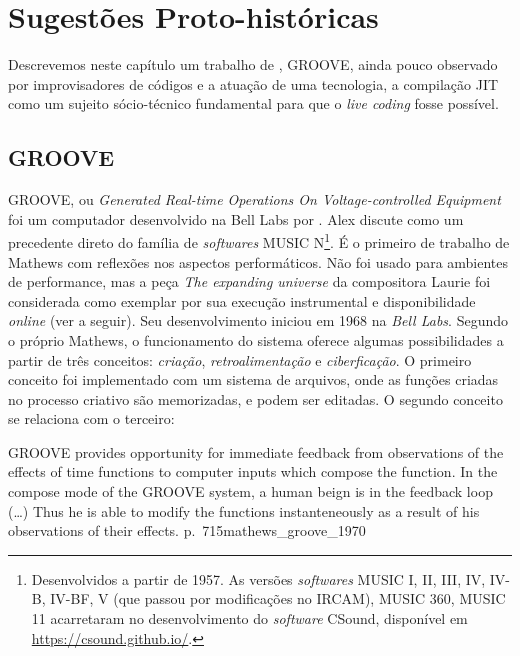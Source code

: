 \chapter{Sugestões Proto-históricas}\label{app:B}

Descrevemos neste capítulo um trabalho de , GROOVE, ainda pouco observado por improvisadores de códigos e a atuação de uma tecnologia, a compilação JIT \cite{aycock_brief_2003} como um sujeito sócio-técnico fundamental para que o \emph{live coding} fosse possível.

\section{GROOVE}

GROOVE, ou \emph{Generated Real-time Operations On Voltage-controlled Equipment} foi um computador desenvolvido na Bell Labs por \cite{mathews_groove_1970}. Alex  discute como um precedente direto do família de \emph{softwares} MUSIC N\footnote{Desenvolvidos a partir de 1957. As versões \emph{softwares} MUSIC I, II, III, IV, IV-B, IV-BF, V (que passou por modificações no IRCAM), MUSIC 360, MUSIC 11 acarretaram no desenvolvimento do \emph{software} CSound, disponível em \url{https://csound.github.io/}.}. É o primeiro de trabalho de Mathews com reflexões nos aspectos performáticos. Não foi usado para ambientes de performance, mas a peça \emph{The expanding universe} da compositora Laurie  foi considerada como exemplar por sua execução instrumental e disponibilidade \emph{online} (ver a seguir). Seu desenvolvimento iniciou em 1968 na \emph{Bell Labs}. Segundo o próprio Mathews, o funcionamento do sistema oferece algumas possibilidades a partir de três conceitos: \emph{criação}, \emph{retroalimentação} e \emph{ciberficação}. O primeiro conceito foi implementado com um sistema de arquivos, onde as funções criadas no processo criativo são memorizadas, e podem ser editadas. O segundo conceito se relaciona com o terceiro:

{
GROOVE provides opportunity for immediate feedback from observations of the effects of time functions to computer inputs which compose the function. In the compose mode of the GROOVE system, a human beign is in the feedback loop (\ldots) Thus he is able to modify the functions instanteneously as a result of his observations of their effects.
}
{p.~715}{mathews_groove_1970}

